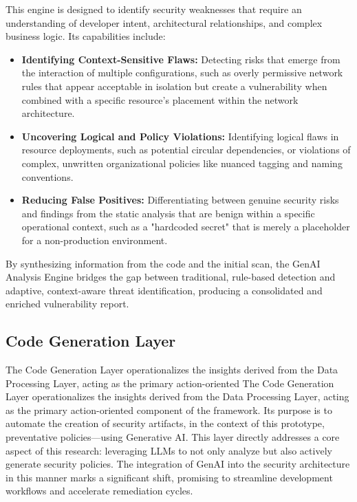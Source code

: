 This engine is designed to identify security weaknesses that require an understanding of developer intent, architectural relationships, and complex business logic\cite{noseevich_towards_2015}. Its capabilities include:

\begin{itemize}
    \item \textbf{Identifying Context-Sensitive Flaws:} Detecting risks that emerge from the interaction of multiple configurations, such as overly permissive network rules that appear acceptable in isolation but create a vulnerability when combined with a specific resource's placement within the network architecture\cite{noseevich_towards_2015}.
    \item \textbf{Uncovering Logical and Policy Violations:} Identifying logical flaws in resource deployments, such as potential circular dependencies, or violations of complex, unwritten organizational policies like nuanced tagging and naming conventions.
    \item \textbf{Reducing False Positives:} Differentiating between genuine security risks and findings from the static analysis that are benign within a specific operational context, such as a "hardcoded secret" that is merely a placeholder for a non-production environment.
\end{itemize}

By synthesizing information from the code and the initial scan, the GenAI Analysis Engine bridges the gap between traditional, rule-based detection and adaptive, context-aware threat identification, producing a consolidated and enriched vulnerability report.


\subsection{Code Generation Layer} %
\label{sec:Code Generation Laye}

The Code Generation Layer operationalizes the insights derived from the Data Processing Layer, acting as the primary action-oriented The Code Generation Layer operationalizes the insights derived from the Data Processing Layer, acting as the primary action-oriented component of the framework. Its purpose is to automate the creation of security artifacts, in the context of this prototype, preventative policies—using Generative AI. This layer directly addresses a core aspect of this research: leveraging LLMs to not only analyze but also actively generate security policies. The integration of GenAI into the security architecture in this manner marks a significant shift, promising to streamline development workflows and accelerate remediation cycles\cite{kumar_generative_nodate}.

